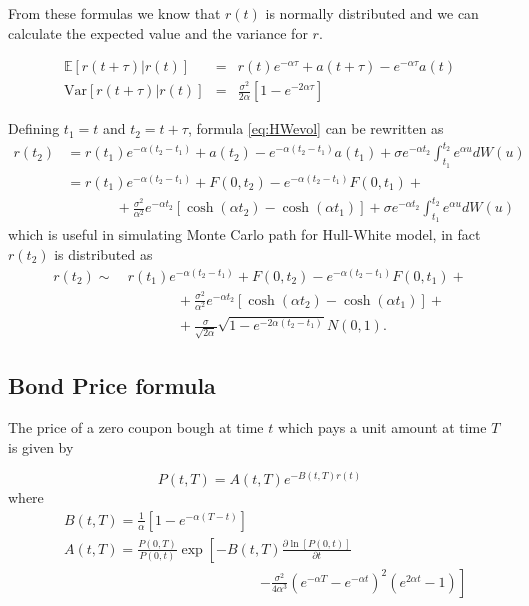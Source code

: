From these formulas we know that $r(t)$ is normally distributed and we can calculate the expected value and the variance for $r$.

\begin{eqnarray}
\mathbb{E}[r(t+\tau)|r(t)] & = & r(t) e^{-\alpha \tau} + a(t+\tau) - e^{-\alpha\tau}a(t) \\
\mathrm{Var}[r(t+\tau)|r(t)] & = & \frac{\sigma^2}{2\alpha}\left[1-e^{-2\alpha\tau}\right]
\end{eqnarray}

Defining $t_1=t$ and $t_2=t+\tau$, formula \ref{eq:HWevol} can be rewritten as
\begin{align}
r(t_2) & = r(t_1) e^{-\alpha (t_2-t_1)} + a(t_2) - e^{-\alpha(t_2-t_1)}a(t_1) + \sigma e^{-\alpha t_2}\int_{t_1}^{t_2}e^{\alpha u}dW(u)\nonumber\\
  & = r(t_1) e^{-\alpha (t_2-t_1)} + F(0,t_2) - e^{-\alpha (t_2-t_1)}F(0,t_1) + \nonumber\\
  & \phantom{mmmm} + \frac{\sigma^2}{\alpha^2}e^{-\alpha t_2}\left[\cosh(\alpha t_2)-\cosh(\alpha t_1)\right] + \sigma e^{-\alpha t_2}\int_{t_1}^{t_2}e^{\alpha u}dW(u)
\end{align}
which is useful in simulating Monte Carlo path for Hull-White model, in fact $r(t_2)$ is distributed as
\begin{align}
r(t_2) \sim\  & r(t_1) e^{-\alpha (t_2-t_1)} + F(0,t_2) - e^{-\alpha (t_2-t_1)}F(0,t_1) + \nonumber\\
 & \phantom{mmmm}+ \frac{\sigma^2}{\alpha^2}e^{-\alpha t_2}\left[\cosh(\alpha t_2)-\cosh(\alpha t_1)\right] + \nonumber\\
 & \phantom{mmmm}+ \frac{\sigma}{\sqrt{2\alpha}}\sqrt{1-e^{-2\alpha(t_2-t_1)}}N(0,1).
\end{align}

\subsection{Bond Price formula}

The price of a zero coupon bough at time $t$ which pays a unit amount at time $T$ is given by

\begin{equation}
P(t,T) = A(t,T) e^{-B(t,T)r(t)}
\end{equation}
where
\begin{align}
& B(t,T) = \frac{1}{\alpha}\left[ 1 - e^{-\alpha(T-t)} \right]\\
& A(t,T) = \frac{P(0,T)}{P(0,t)}\exp\left[ -B(t,T) \frac{\partial \ln[P(0,t)]}{\partial t} \right.\nonumber\\
& \qquad\qquad\qquad\qquad\qquad\qquad\qquad \left. - \frac{\sigma^2}{4\alpha^3}\left( e^{-\alpha T} - e^{-\alpha t} \right)^2 \left( e^{2\alpha t} -1 \right) \right]
\end{align}

